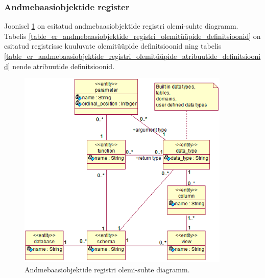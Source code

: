 \documentclass[a4paper,12pt]{article} %
\begin{document}
\subsubsection{Andmebaasiobjektide register}
Joonisel \ref{fig_andmebaasiobjektide_registri_olemi_suhte_diagramm} on esitatud andmebaasiobjektide registri olemi-suhte diagramm. Tabelis \ref{table_er_andmebaasiobjektide_registri_olemitüüpide_definitsioonid} on esitatud registrisse kuuluvate olemitüüpide definitsioonid ning tabelis \ref{table_er_andmebaasiobjektide_registri_olemitüüpide_atribuutide_definitsioonid} nende atribuutide definitsioonid.

\begin{figure}[H]
\centering
\includegraphics[width=0.9\textwidth]{./diagrams/database-object-er-diagram.png}
\caption{Andmebaasiobjektide registri olemi-suhte diagramm.}
\label{fig_andmebaasiobjektide_registri_olemi_suhte_diagramm}
\end{figure}
\end{document}
